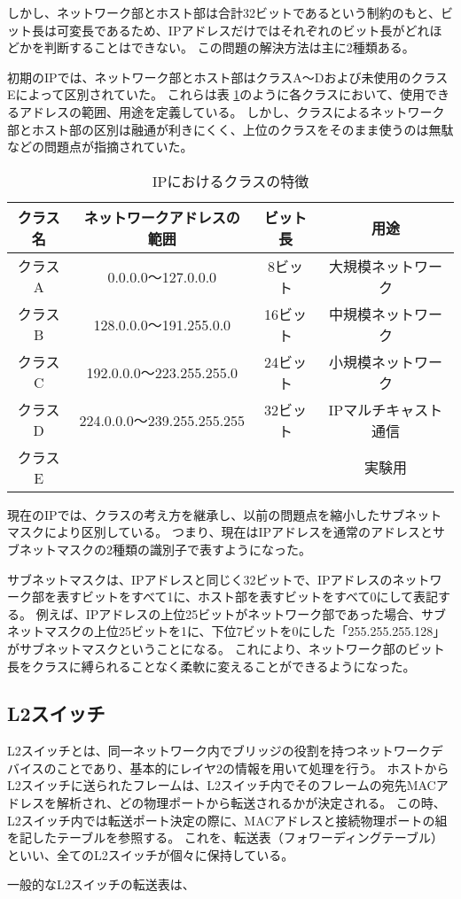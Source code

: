 しかし、ネットワーク部とホスト部は合計32ビットであるという制約のもと、ビット長は可変長であるため、IPアドレスだけではそれぞれのビット長がどれほどかを判断することはできない。
この問題の解決方法は主に2種類ある。

初期のIPでは、ネットワーク部とホスト部はクラスA～Dおよび未使用のクラスEによって区別されていた。
これらは表 \ref{tab:2-3}のように各クラスにおいて、使用できるアドレスの範囲、用途を定義している。
しかし、クラスによるネットワーク部とホスト部の区別は融通が利きにくく、上位のクラスをそのまま使うのは無駄などの問題点が指摘されていた。

\begin{table}[tb]
	\begin{center}
		\caption{IPにおけるクラスの特徴}
		\begin{tabular}{c|c|c|c}
			\hline \hline
			クラス名 & ネットワークアドレスの範囲 & ビット長 & 用途　\\ \hline
			クラスA & 0.0.0.0～127.0.0.0 & 8ビット & 大規模ネットワーク\\
			クラスB & 128.0.0.0～191.255.0.0 & 16ビット & 中規模ネットワーク \\
			クラスC & 192.0.0.0～223.255.255.0 & 24ビット & 小規模ネットワーク \\
			クラスD & 224.0.0.0～239.255.255.255 & 32ビット & IPマルチキャスト通信\\
			クラスE & & & 実験用　\\ \hline
		\end{tabular}
		\label{tab:2-3}
	\end{center}
\end{table}

現在のIPでは、クラスの考え方を継承し、以前の問題点を縮小したサブネットマスクにより区別している。
つまり、現在はIPアドレスを通常のアドレスとサブネットマスクの2種類の識別子で表すようになった。

サブネットマスクは、IPアドレスと同じく32ビットで、IPアドレスのネットワーク部を表すビットをすべて1に、ホスト部を表すビットをすべて0にして表記する。
例えば、IPアドレスの上位25ビットがネットワーク部であった場合、サブネットマスクの上位25ビットを1に、下位7ビットを0にした「255.255.255.128」がサブネットマスクということになる。
これにより、ネットワーク部のビット長をクラスに縛られることなく柔軟に変えることができるようになった。

\subsection{L2スイッチ}

L2スイッチとは、同一ネットワーク内でブリッジの役割を持つネットワークデバイスのことであり、基本的にレイヤ2の情報を用いて処理を行う\cite{masteringtcpip}。
ホストからL2スイッチに送られたフレームは、L2スイッチ内でそのフレームの宛先MACアドレスを解析され、どの物理ポートから転送されるかが決定される。
この時、L2スイッチ内では転送ポート決定の際に、MACアドレスと接続物理ポートの組を記したテーブルを参照する。
これを、転送表（フォワーディングテーブル）といい、全てのL2スイッチが個々に保持している。

一般的なL2スイッチの転送表は、